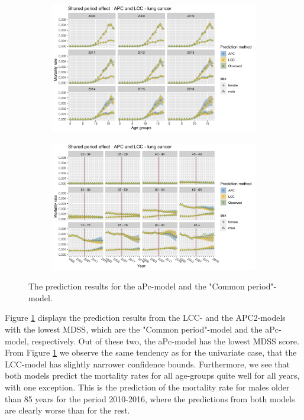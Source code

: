 \begin{figure}
    \centering
    \begin{subfigure}[b]{.6\linewidth}
        \includegraphics[width=\linewidth]{real-data/real-data-multivariate/Figures/multivariate-comparison-by-age-lung.png}
    \end{subfigure}
    
    \begin{subfigure}[b]{.6\linewidth}
        \includegraphics[width=\linewidth]{real-data/real-data-multivariate/Figures/multivariate-comparison-by-period-lung.png}
    \end{subfigure}
    \caption{The prediction results for the aPc-model and the "Common period"-model.}
    \label{fig:mv-APC-LCC-lung}
\end{figure}

Figure \ref{fig:mv-APC-LCC-lung} displays the prediction results from the LCC- and the APC2-models with the lowest MDSS, which are the "Common period"-model and the aPc-model, respectively. Out of these two, the aPc-model has the lowest MDSS score. From Figure \ref{fig:mv-APC-LCC-lung} we observe the same tendency as for the univariate case, that the LCC-model has slightly narrower confidence bounds. Furthermore, we see that both models predict the mortality rates for all age-groups quite well for all years, with one exception. This is the prediction of the mortality rate for males older than 85 years for the period 2010-2016, where the predictions from both models are clearly worse than for the rest.